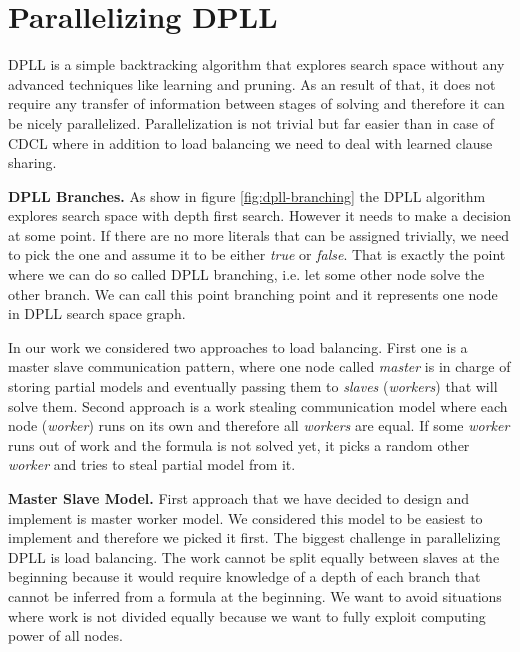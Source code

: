 \documentclass[letterpaper]{article}
\newcommand{\mypar}[1]{{\bf #1.}}
\begin{document}
\section{Parallelizing DPLL}\label{sec:parallel_dpll}

DPLL is a simple backtracking algorithm that explores search space without any advanced techniques like learning and pruning. As an result of that, it does not require any transfer of information between stages of solving and therefore it can be nicely parallelized. Parallelization is not trivial but far easier than in case of CDCL where in addition to load balancing we need to deal with learned clause sharing. 


\mypar{DPLL Branches}
As show in figure \ref{fig:dpll-branching} the DPLL algorithm explores search space with depth first search. However it needs to make a decision at some point. If there are no more literals that can be assigned trivially, we need to pick the one and assume it to be either \textit{true} or \textit{false}. That is exactly the point where we can do so called DPLL branching, i.e. let some other node solve the other branch. We can call this point branching point and it represents one node in DPLL search space graph. 

In our work we considered two approaches to load balancing. 
First one is a master slave communication pattern, where one node called \textit{master} is in charge of storing partial models and eventually passing them to \textit{slaves} (\textit{workers}) that will solve them.
Second approach is a work stealing communication model where each node (\textit{worker}) runs on its own and therefore all \textit{workers} are equal. If some \textit{worker} runs out of work and the formula is not solved yet, it picks a random other \textit{worker} and tries to steal partial model from it.

\mypar{Master Slave Model}
First approach that we have decided to design and implement is master worker model. We considered this model to be easiest to implement and therefore we picked it first. The biggest challenge in parallelizing DPLL is load balancing. The work cannot be split equally between slaves at the beginning because it would require knowledge of a depth of each branch that cannot be inferred from a formula at the beginning. We want to avoid situations where work is not divided equally because we want to fully exploit computing power of all nodes. 
\end{document}
